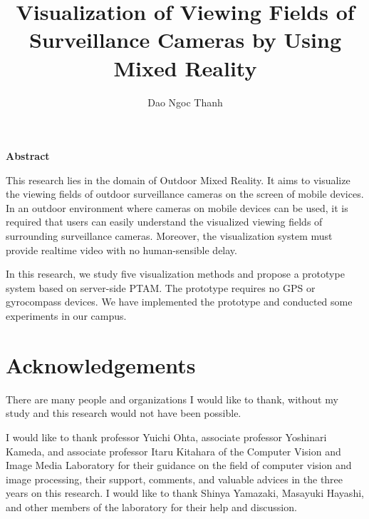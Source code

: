 \documentclass[a4paper,11pt]{report}
\title{Visualization of Viewing Fields of Surveillance Cameras by Using Mixed Reality}
\author{Dao Ngoc Thanh}
\begin{document}
\maketitle
\thispagestyle{empty}
\newpage

\thispagestyle{empty}
\vspace*{20pt plus 1fil}
\noindent
\begin{center}
{\bf Abstract}
\vspace{5mm}
\end{center}
This research lies in the domain of Outdoor Mixed Reality. It aims to visualize the viewing fields of outdoor surveillance cameras on the screen of mobile devices. In an outdoor environment where cameras on mobile devices can be used, it is required that users can easily understand the visualized viewing fields of surrounding surveillance cameras. Moreover, the visualization system must provide realtime video with no human-sensible delay.

In this research, we study five visualization methods and propose a prototype system based on server-side PTAM. The prototype requires no GPS or gyrocompass devices. We have implemented the prototype and conducted some experiments in our campus.

\par
\vspace{0pt plus 1fil}
\newpage

\tableofcontents
\listoffigures

\pagebreak \setcounter{page}{1}







\chapter*{Acknowledgements}

There are many people and organizations I would like to thank, without my study and this research would not have been possible.

I would like to thank professor Yuichi Ohta, associate professor Yoshinari Kameda, and associate professor Itaru Kitahara of the Computer Vision and Image Media Laboratory for their guidance on the field of computer vision and image processing, their support, comments, and valuable advices in the three years on this research. I would like to thank Shinya Yamazaki, Masayuki Hayashi, and other members of the laboratory for their help and discussion.
\end{document}
